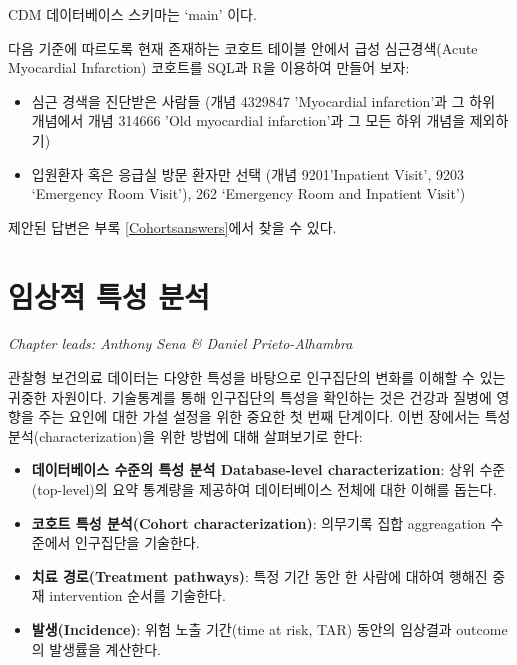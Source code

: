 \documentclass[11pt]{book}
\providecommand{\tightlist}{%
  \setlength{\itemsep}{0pt}\setlength{\parskip}{0pt}}
\theoremstyle{definition}
\theoremstyle{definition}
\theoremstyle{definition}
\theoremstyle{remark}
\let\BeginKnitrBlock\begin \let\EndKnitrBlock\end
\begin{document}
CDM 데이터베이스 스키마는 `main' 이다.

\BeginKnitrBlock{exercise}
\protect\hypertarget{exr:exerciseCohortsSql}{}{\label{exr:exerciseCohortsSql}
}다음 기준에 따르도록 현재 존재하는 코호트 테이블 안에서 급성
심근경색(Acute Myocardial Infarction) 코호트를 SQL과 R을 이용하여 만들어
보자:

\begin{itemize}
\tightlist
\item
  심근 경색을 진단받은 사람들 (개념 4329847 'Myocardial infarction'과 그
  하위 개념에서 개념 314666 'Old myocardial infarction'과 그 모든 하위
  개념을 제외하기)
\item
  입원환자 혹은 응급실 방문 환자만 선택 (개념 9201'Inpatient Visit',
  9203 `Emergency Room Visit'), 262 `Emergency Room and Inpatient
  Visit')
\end{itemize}
\EndKnitrBlock{exercise}

제안된 답변은 부록 \ref{Cohortsanswers}에서 찾을 수 있다.

\chapter{임상적 특성 분석}\label{Characterization}

\emph{Chapter leads: Anthony Sena \& Daniel Prieto-Alhambra}

관찰형 보건의료 데이터는 다양한 특성을 바탕으로 인구집단의 변화를 이해할
수 있는 귀중한 자원이다. 기술통계를 통해 인구집단의 특성을 확인하는 것은
건강과 질병에 영향을 주는 요인에 대한 가설 설정을 위한 중요한 첫 번째
단계이다. 이번 장에서는 특성 분석(characterization)을 위한 방법에 대해
살펴보기로 한다:

\begin{itemize}
\tightlist
\item
  \textbf{데이터베이스 수준의 특성 분석 Database-level
  characterization}: 상위 수준(top-level)의 요약 통계량을 제공하여
  데이터베이스 전체에 대한 이해를 돕는다.
\item
  \textbf{코호트 특성 분석(Cohort characterization)}: 의무기록 집합
  aggreagation 수준에서 인구집단을 기술한다.
\item
  \textbf{치료 경로(Treatment pathways)}: 특정 기간 동안 한 사람에
  대하여 행해진 중재 intervention 순서를 기술한다.
\item
  \textbf{발생(Incidence)}: 위험 노출 기간(time at risk, TAR) 동안의
  임상결과 outcome의 발생률을 계산한다.
\end{itemize}
\end{document}
